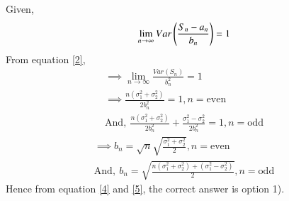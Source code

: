 \documentclass[journal,12pt,twocolumn]{IEEEtran}
\begin{document}
Given,
\begin{align}
    \lim_{n\to\infty}Var\left(\frac{S_n-a_n}{b_n}\right)=1
\end{align}
From equation \eqref{2},
\begin{align}
    \implies \lim_{n\to\infty}\frac{Var(S_n)}{b_n^2}=1\\
    \implies \frac{n(\sigma_1^2+\sigma_2^2)}{2b_n^2}=1,n=\mathrm{even}\\
    \mathrm{And,\:}\frac{n(\sigma_1^2+\sigma_2^2)}{2b_n^2}+\frac{\sigma_1^2-\sigma_2^2}{2b_n^2}=1,n=\mathrm{odd}
    \end{align}
    \begin{align}
    \implies b_n=\sqrt{n}\sqrt{\frac{\sigma_1^2+\sigma_2^2}{2}},n=\mathrm{even}\label{4}\\
    \mathrm{And,\:}b_n=\sqrt{\frac{n(\sigma_1^2+\sigma_2^2)+(\sigma_1^2-\sigma_2^2)}{2}},n=\mathrm{odd}
\end{align}
Hence from equation \eqref{4} and \eqref{5}, the correct answer is option 1).
\end{document}
